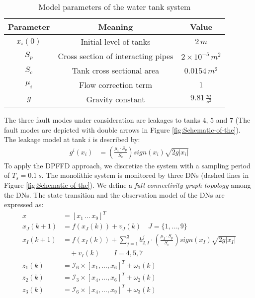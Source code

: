 \documentclass[10pt,twocolumn,twoside]{IEEEtran}
\begin{document}
\begin{table}
\caption{Model parameters of the water tank system \label{tab:Model-parameters-of-1}}


\centering{}\begin{tabular}{|c|c|c|}
\hline 
Parameter & Meaning & Value\tabularnewline
\hline 
$x_{i}(0)$ & Initial level of tanks & $2\, m$\tabularnewline
$S_{p}$ & Cross section of interacting pipes & $2\times10^{-5}\, m^{2}$\tabularnewline
$S_{c}$ & Tank cross sectional area & $0.0154\, m^{2}$\tabularnewline
$\mu_{i}$ & Flow correction term  & $1$\tabularnewline
$g$ & Gravity constant & $9.81\,\frac{m}{s^{2}}$\tabularnewline
\hline 
\end{tabular}
\end{table}
The three fault modes under consideration are leakages to tanks $4$,
$5$ and $7$ (The fault modes are depicted with double arrows in
Figure \ref{fig:Schematic-of-the}). The leakage model at tank $i$
is described by: 
\begin{equation}
\begin{aligned}g^{i}\left(x_{i}\right) & =\left(\frac{\mu_{i}\cdot S_{p}}{S_{c}}\right)sign(x_{i})\sqrt{2g|x_{i}|}\end{aligned}
\label{eq:fault progression model}
\end{equation}
To apply the DPFFD approach, we discretize the system with a sampling
period of $T_{s}=0.1\: s$. The monolithic system is monitored by
three DNs (dashed lines in Figure \ref{fig:Schematic-of-the}). We
define a \textit{\small{}full-connectivity graph topology} among the
DNs. The state transition and the observation model of the DNs
are expressed as:
\begin{equation}
\begin{aligned}x & =[x_{1}\,\ldots\, x_{9}]^{T}\\
x_{J}(k+1) & =f(x_{J}(k))+v_{J}(k)\quad J=\{1,\ldots,9\}\\
x_{I}(k+1) & =f(x_{I}(k))+\sum_{j=1}^{3}b_{2,I}^{j}\cdot\left(\frac{\mu_{I}\cdot S_{p}}{S_{c}}\right)sign(x_{I})\sqrt{2g|x_{I}|}\\
 & \quad+v_{I}(k)\qquad I=4,5,7\\
z_{1}(k) & =\mathcal{I}_{6}\times[x_{1},\ldots,x_{6}]^{T}+\omega_{1}(k)\\
z_{2}(k) & =\mathcal{I}_{3}\times[x_{4},\ldots,x_{6}]^{T}+\omega_{2}(k)\\
z_{3}(k) & =\mathcal{I}_{6}\times[x_{4},\ldots,x_{9}]^{T}+\omega_{3}(k)
\end{aligned}
\label{eq:observation of each LD}
\end{equation}
\end{document}

